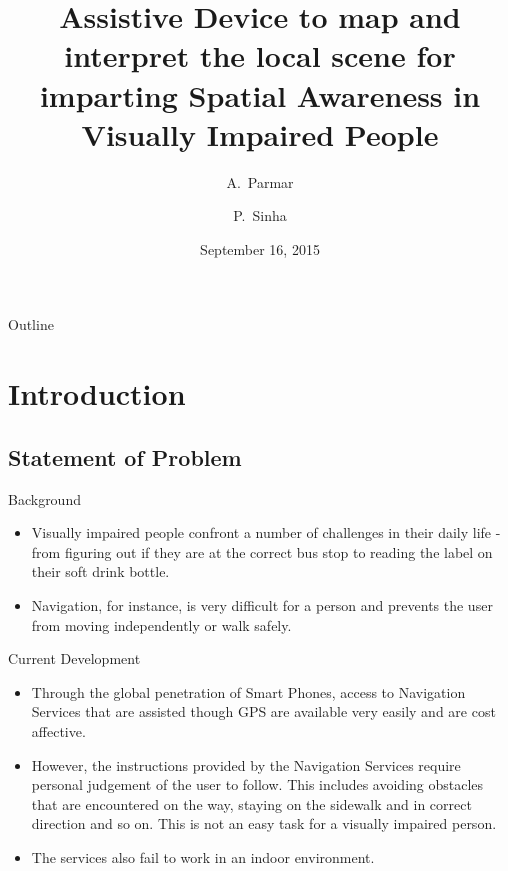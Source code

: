 \documentclass{beamer}
\title{Assistive Device to map and interpret the local scene for imparting Spatial Awareness in Visually Impaired People}
\author{A.~Parmar \and P.~Sinha}
\institute[University of Delhi]
{
  Design Innovation Centre\\
  University of Delhi}
\date{September 16, 2015}
\begin{document}
\begin{frame}
  \titlepage
\end{frame}

\begin{frame}{Outline}
  \tableofcontents
\end{frame}

\section{Introduction}
\subsection{Statement of Problem}
\begin{frame}{Background}
  \begin{itemize}
  \item {
    Visually impaired people confront a number of challenges in their daily life - from figuring out if they are at the correct bus stop to reading the label on their soft drink bottle.
  }
  \item {
    Navigation, for instance, is very difficult for a person and prevents the user from moving independently or walk safely.
  }
  \end{itemize}
\end{frame}
\begin{frame}{Current Development}
  \begin{itemize}
  \item {
    Through the global penetration of Smart Phones, access to Navigation Services that are assisted though GPS are available very easily and are cost affective.
  }
  \item {
    However, the instructions provided by the Navigation Services require personal judgement of the user to follow. This includes avoiding obstacles that are encountered on the way, staying on the sidewalk and in correct direction and so on. This is not an easy task for a visually impaired person.
  }
  \item {
    The services also fail to work in an indoor environment.
  }
  \end{itemize}
\end{frame}
\end{document}
